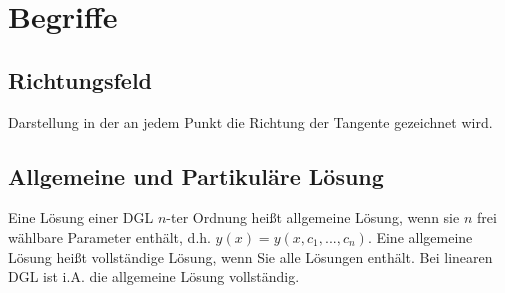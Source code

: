 \section{Begriffe}
	\subsection{Richtungsfeld}
	\begin{bem}
		Darstellung in der an jedem Punkt die Richtung der Tangente gezeichnet wird.
	\end{bem}
	\subsection{Allgemeine und Partikuläre Lösung}
	\begin{bem}
		Eine Lösung einer DGL $n$-ter Ordnung heißt allgemeine Lösung, wenn sie $n$ frei wählbare Parameter enthält, d.h. $y(x) = y(x,c_1,...,c_n)$. Eine allgemeine Lösung heißt vollständige Lösung, wenn Sie alle Lösungen enthält. Bei linearen DGL ist i.A. die allgemeine Lösung vollständig.
	\end{bem}
	